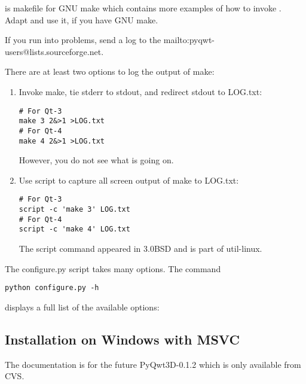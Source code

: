 \documentclass{manual}
\makeatletter
\newcommand{\mailinglist}{\ulink{mailing list}
  {mailto:pyqwt-users@lists.sourceforge.net}}
\newcommand{\Future}{
  \begin{notice}[warning]
    The documentation is for the future PyQwt3D-0.1.2 which is only available
    from CVS.
  \end{notice}
}
\makeatother
\begin{document}
\begin{notice}[note]
   is makefile for GNU make which contains more
  examples of how to invoke .
  Adapt and use it, if you have GNU make.
\end{notice}

\begin{notice}[note]
  If you run into problems, send a log to the \mailinglist{}.

  There are at least two options to log the output of make:
  \begin{enumerate}
  \item Invoke make, tie stderr to stdout, and redirect stdout to LOG.txt:
\begin{verbatim}
# For Qt-3
make 3 2&>1 >LOG.txt
# For Qt-4
make 4 2&>1 >LOG.txt
\end{verbatim}
    However, you do not see what is going on.
  \item Use script to capture all screen output of make to LOG.txt:
\begin{verbatim}
# For Qt-3
script -c 'make 3' LOG.txt
# For Qt-4
script -c 'make 4' LOG.txt
\end{verbatim}
    The script command appeared in 3.0BSD and is part of util-linux.
  \end{enumerate}
\end{notice}

\begin{notice}[note]
  The configure.py script takes many options. The command
\begin{verbatim}
python configure.py -h
\end{verbatim}
  displays a full list of the available options:
  
\end{notice}


\subsection{Installation on Windows with MSVC\label{win-install}}

\Future{}
\end{document}
